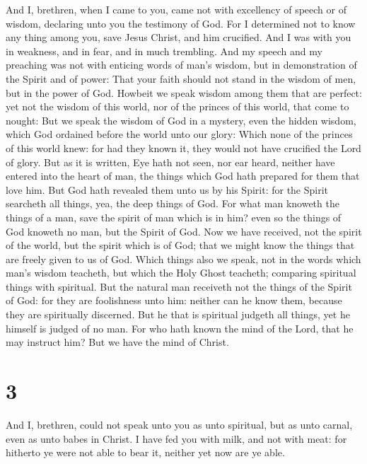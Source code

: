  And I, brethren, when I came to you, came not with
excellency of speech or of wisdom, declaring unto you the testimony of
God.  For I determined not to know any thing among you,
save Jesus Christ, and him crucified.  And I was with you
in weakness, and in fear, and in much trembling.  And my
speech and my preaching was not with enticing words of man's wisdom, but
in demonstration of the Spirit and of power:  That your
faith should not stand in the wisdom of men, but in the power of God.
 Howbeit we speak wisdom among them that are perfect: yet
not the wisdom of this world, nor of the princes of this world, that
come to nought:  But we speak the wisdom of God in a
mystery, even the hidden wisdom, which God ordained before the world
unto our glory:  Which none of the princes of this world
knew: for had they known it, they would not have crucified the Lord of
glory.  But as it is written, Eye hath not seen, nor ear
heard, neither have entered into the heart of man, the things which God
hath prepared for them that love him.  But God hath
revealed them unto us by his Spirit: for the Spirit searcheth all
things, yea, the deep things of God.  For what man
knoweth the things of a man, save the spirit of man which is in him?
even so the things of God knoweth no man, but the Spirit of God.
 Now we have received, not the spirit of the world, but
the spirit which is of God; that we might know the things that are
freely given to us of God.  Which things also we speak,
not in the words which man's wisdom teacheth, but which the Holy Ghost
teacheth; comparing spiritual things with spiritual.  But
the natural man receiveth not the things of the Spirit of God: for they
are foolishness unto him: neither can he know them, because they are
spiritually discerned.  But he that is spiritual judgeth
all things, yet he himself is judged of no man.  For who
hath known the mind of the Lord, that he may instruct him? But we have
the mind of Christ.

\hypertarget{section-2}{%
\section{3}\label{section-2}}

 And I, brethren, could not speak unto you as unto
spiritual, but as unto carnal, even as unto babes in Christ.
 I have fed you with milk, and not with meat: for hitherto
ye were not able to bear it, neither yet now are ye able.

